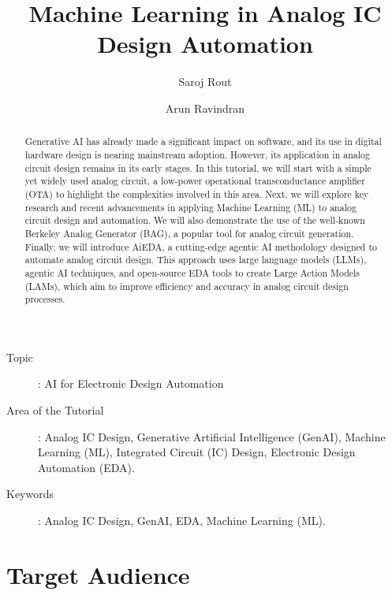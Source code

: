 \documentclass[12pt]{article}
\title{Machine Learning in Analog IC Design Automation}
\author[1]{Saroj Rout}
\author[2]{Arun Ravindran}
\affil[1]{EE Dept., Silicon University, India}
\affil[2]{ECE Dept., UNC Charlotte, USA}
\begin{document}
\pagestyle{fancy}
\fancyhead{}
\maketitle

\begin{abstract}

Generative AI has already made a significant impact on software, and its use in digital hardware design is nearing mainstream adoption. However, its application in analog circuit design remains in its early stages. In this tutorial, we will start with a simple yet widely used analog circuit, a low-power operational transconductance amplifier (OTA) to highlight the complexities involved in this area.
Next, we will explore key research and recent advancements in applying Machine Learning (ML) to analog circuit design and automation. We will also demonstrate the use of the well-known Berkeley Analog Generator (BAG), a popular tool for analog circuit generation.
Finally, we will introduce AiEDA, a cutting-edge agentic AI methodology designed to automate analog circuit design. This approach uses large language models (LLMs), agentic AI techniques, and open-source EDA tools to create Large Action Models (LAMs), which aim to improve efficiency and accuracy in analog circuit design processes.
\end{abstract}


\begin{description}
    \item[Topic]: AI for Electronic Design Automation 
    \item[Area of the Tutorial]:  Analog IC Design, Generative Artificial Intelligence (GenAI), Machine Learning (ML), Integrated Circuit (IC) Design, Electronic Design Automation (EDA).
    \item[Keywords]: Analog IC Design, GenAI, EDA, Machine Learning (ML). 
\end{description}


\section*{Target Audience}
\end{document}
